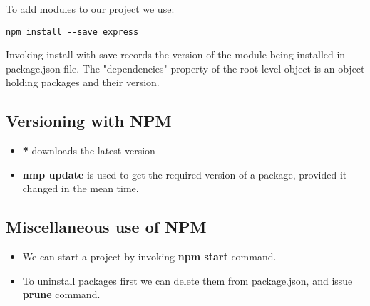 \documentclass[12pt, a4paper]{article}
\begin{document}
To add modules to our project we use:
\begin{verbatim}
npm install --save express
\end{verbatim}
Invoking install with save records the version of the module being installed in package.json file.
The "dependencies" property of the root level object is an object holding packages and their version.
\subsection{Versioning with NPM}
\begin{itemize}
\item \textbf{*} downloads the latest version
\item \textbf{nmp update} is used to get the required version of a package, provided it changed in the mean time.
\end{itemize}
\subsection{Miscellaneous use of NPM}
\begin{itemize}
\item We can start a project by invoking \textbf{npm start} command.
\item To uninstall packages first we can delete them from package.json, and issue \textbf{prune} command.
\end{itemize}
\end{document}
